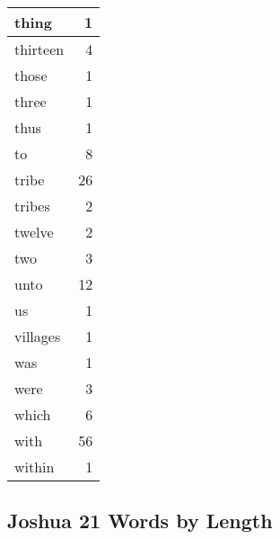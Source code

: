 \begin{center}
\begin{longtable}{l|r}
thing & 1\\ \hline 
thirteen & 4\\ \hline 
those & 1\\ \hline 
three & 1\\ \hline 
thus & 1\\ \hline 
to & 8\\ \hline 
tribe & 26\\ \hline 
tribes & 2\\ \hline 
twelve & 2\\ \hline 
two & 3\\ \hline 
unto & 12\\ \hline 
us & 1\\ \hline 
villages & 1\\ \hline 
was & 1\\ \hline 
were & 3\\ \hline 
which & 6\\ \hline 
with & 56\\ \hline 
within & 1\\ \hline 
\end{longtable}
\end{center}





\subsection{Joshua 21 Words by Length}


\normalsize
 
